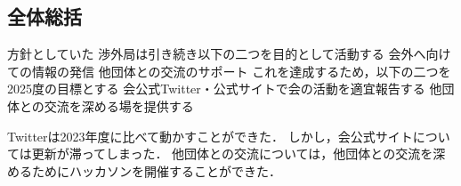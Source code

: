 \subsection*{全体総括}


方針としていた
        渉外局は引き続き以下の二つを目的として活動する
        会外へ向けての情報の発信
        他団体との交流のサポート
    これを達成するため，以下の二つを2025度の目標とする
        会公式Twitter・公式サイトで会の活動を適宜報告する
        他団体との交流を深める場を提供する

Twitterは2023年度に比べて動かすことができた．
しかし，会公式サイトについては更新が滞ってしまった．
他団体との交流については，他団体との交流を深めるためにハッカソンを開催することができた．

